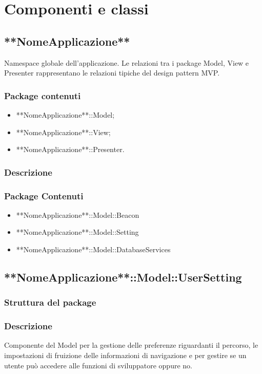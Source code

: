 \documentclass[../SpecificaTecnica.tex]{subfiles}
\begin{document}
\section{Componenti e classi}
	\subsection{**NomeApplicazione**}
	Namespace globale dell'applicazione. Le relazioni tra i package Model, View e Presenter rappresentano le relazioni tipiche del design pattern MVP.
		\subsubsection{Package contenuti}
			\begin{itemize}
				\item **NomeApplicazione**::Model;
				\item **NomeApplicazione**::View;
				\item **NomeApplicazione**::Presenter.
			\end{itemize}
		\subsubsection{Descrizione}
		\subsubsection{Package Contenuti}
			\begin{itemize}
				\item **NomeApplicazione**::Model::Beacon
				\item **NomeApplicazione**::Model::Setting
				\item **NomeApplicazione**::Model::DatabaseServices
			\end{itemize}
	\subsection{**NomeApplicazione**::Model::UserSetting}
		\subsubsection{Struttura del package}
		\subsubsection{Descrizione}
			Componente del Model per la gestione delle preferenze riguardanti il percorso, le impostazioni di fruizione delle informazioni di navigazione e per gestire se un utente può accedere alle funzioni di sviluppatore oppure no.
\end{document}
